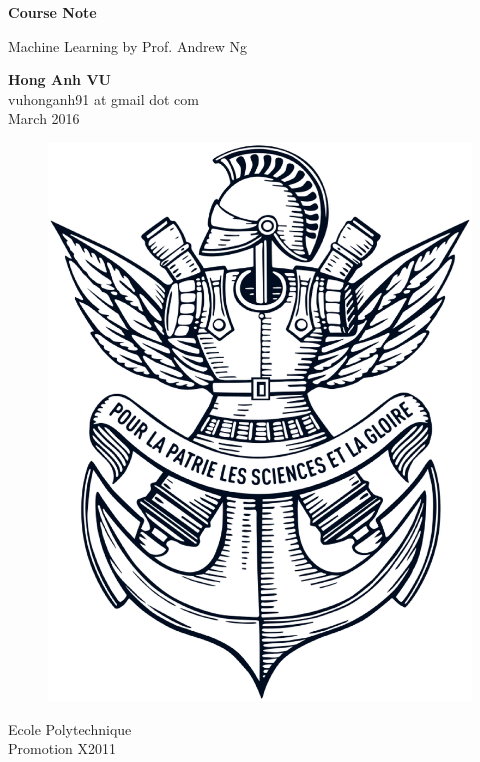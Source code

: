 \documentclass[12pt,oneside,a4paper]{book}
\begin{document}
\boldmath
\begin{titlepage}
    \begin{center}
        
        \Huge
        \textbf{Course Note}
        
        \vspace{0.5cm}
        \LARGE
        Machine Learning by Prof. Andrew Ng
        
        \vspace{1.5cm}
        
        \textbf{Hong Anh VU}\\
        vuhonganh91 at gmail dot com\\
        March 2016
        
        \vfill        

        \begin{figure}[!ht]
          \centering
          \includegraphics[scale=0.28]{xLogo.eps}
        \end{figure}
        
        \Large
        Ecole Polytechnique\\
        Promotion X2011\\
        
    \end{center}
\end{titlepage}
\end{document}
